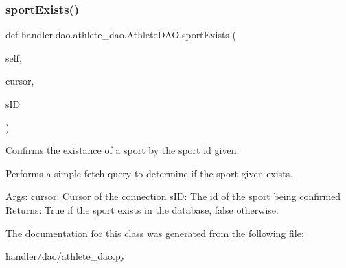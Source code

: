 \subsubsection{\texorpdfstring{sport\+Exists()}{sportExists()}}
{\footnotesize\ttfamily def handler.\+dao.\+athlete\+\_\+dao.\+Athlete\+D\+A\+O.\+sport\+Exists (\begin{DoxyParamCaption}\item[{}]{self,  }\item[{}]{cursor,  }\item[{}]{s\+ID }\end{DoxyParamCaption})}

\begin{DoxyVerb}Confirms the existance of a sport by the sport id
given.

Performs a simple fetch query to determine if 
the sport given exists.

Args:
    cursor: Cursor of the connection
    sID: The id of the sport being confirmed
Returns:
    True if the sport exists in the database, 
    false otherwise.
\end{DoxyVerb}
 

The documentation for this class was generated from the following file\+:\begin{DoxyCompactItemize}
\item 
handler/dao/athlete\+\_\+dao.\+py\end{DoxyCompactItemize}
